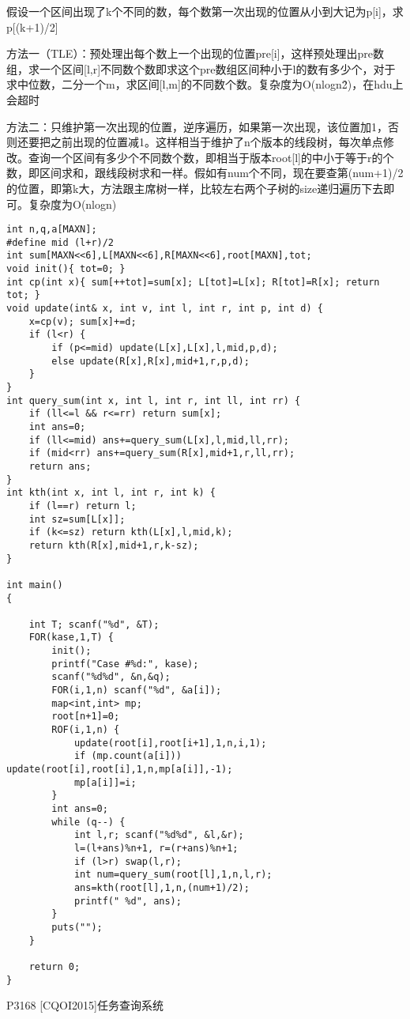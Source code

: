 假设一个区间出现了k个不同的数，每个数第一次出现的位置从小到大记为p[i]，求p[(k+1)/2]

方法一（TLE）：预处理出每个数上一个出现的位置pre[i]，这样预处理出pre数组，求一个区间[l,r]不同数个数即求这个pre数组区间种小于l的数有多少个，对于求中位数，二分一个m，求区间[l,m]的不同数个数。复杂度为O(nlogn\^2)，在hdu上会超时

方法二：只维护第一次出现的位置，逆序遍历，如果第一次出现，该位置加1，否则还要把之前出现的位置减1。这样相当于维护了n个版本的线段树，每次单点修改。查询一个区间有多少个不同数个数，即相当于版本root[l]的中小于等于r的个数，即区间求和，跟线段树求和一样。假如有num个不同，现在要查第(num+1)/2的位置，即第k大，方法跟主席树一样，比较左右两个子树的size递归遍历下去即可。复杂度为O(nlogn)

\begin{lstlisting}
int n,q,a[MAXN];
#define mid (l+r)/2
int sum[MAXN<<6],L[MAXN<<6],R[MAXN<<6],root[MAXN],tot;
void init(){ tot=0; }
int cp(int x){ sum[++tot]=sum[x]; L[tot]=L[x]; R[tot]=R[x]; return tot; }
void update(int& x, int v, int l, int r, int p, int d) {
    x=cp(v); sum[x]+=d;
    if (l<r) {
        if (p<=mid) update(L[x],L[x],l,mid,p,d);
        else update(R[x],R[x],mid+1,r,p,d);
    }
}
int query_sum(int x, int l, int r, int ll, int rr) {
    if (ll<=l && r<=rr) return sum[x];
    int ans=0;
    if (ll<=mid) ans+=query_sum(L[x],l,mid,ll,rr);
    if (mid<rr) ans+=query_sum(R[x],mid+1,r,ll,rr);
    return ans;
}
int kth(int x, int l, int r, int k) {
    if (l==r) return l;
    int sz=sum[L[x]];
    if (k<=sz) return kth(L[x],l,mid,k);
    return kth(R[x],mid+1,r,k-sz);
}

int main()
{

    int T; scanf("%d", &T);
    FOR(kase,1,T) {
        init();
        printf("Case #%d:", kase);
        scanf("%d%d", &n,&q);
        FOR(i,1,n) scanf("%d", &a[i]);
        map<int,int> mp;
        root[n+1]=0;
        ROF(i,1,n) {
            update(root[i],root[i+1],1,n,i,1);
            if (mp.count(a[i])) update(root[i],root[i],1,n,mp[a[i]],-1);
            mp[a[i]]=i;
        }
        int ans=0;
        while (q--) {
            int l,r; scanf("%d%d", &l,&r);
            l=(l+ans)%n+1, r=(r+ans)%n+1;
            if (l>r) swap(l,r);
            int num=query_sum(root[l],1,n,l,r);
            ans=kth(root[l],1,n,(num+1)/2);
            printf(" %d", ans);
        }
        puts("");
    }

    return 0;
}
\end{lstlisting}

P3168 [CQOI2015]任务查询系统

